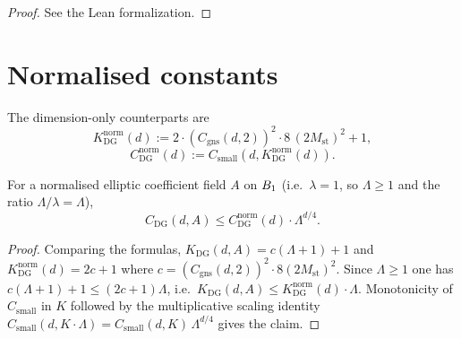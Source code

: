 \begin{proof}
\leanok
{}
See the Lean formalization.
\end{proof}

\section{Normalised constants}

\begin{definition}
\label{def:K_DeGiorgi_subsolution_normalized}
\leanok
{}
The dimension-only counterparts are
\begin{equation*}
  K^{\mathrm{norm}}_{\mathrm{DG}}(d) :=
    2 \cdot (C_{\mathrm{gns}}(d,2))^2 \cdot 8\, (2 M_{\mathrm{st}})^2 + 1,
\end{equation*}
\begin{equation*}
  C^{\mathrm{norm}}_{\mathrm{DG}}(d) :=
    C_{\mathrm{small}}(d, K^{\mathrm{norm}}_{\mathrm{DG}}(d)).
\end{equation*}
\end{definition}

\begin{lemma}
\label{lem:C_DeGiorgi_subsolution_le_normalized}
\leanok
{}
For a normalised elliptic coefficient field $A$ on $B_{1}$ (i.e.\
$\lambda = 1$, so $\Lambda \ge 1$ and the ratio
$\Lambda/\lambda = \Lambda$),
\begin{equation*}
  C_{\mathrm{DG}}(d, A) \le
    C^{\mathrm{norm}}_{\mathrm{DG}}(d) \cdot \Lambda^{d/4}.
\end{equation*}
\end{lemma}

\begin{proof}
\leanok
{}

Comparing the formulas, $K_{\mathrm{DG}}(d,A) = c (\Lambda+1) + 1$ and
$K^{\mathrm{norm}}_{\mathrm{DG}}(d) = 2c + 1$ where $c =
(C_{\mathrm{gns}}(d,2))^2 \cdot 8 (2 M_{\mathrm{st}})^2$. Since
$\Lambda \ge 1$ one has $c(\Lambda + 1) + 1 \le (2c+1)\Lambda$,
i.e.\ $K_{\mathrm{DG}}(d,A) \le K^{\mathrm{norm}}_{\mathrm{DG}}(d) \cdot
\Lambda$. Monotonicity of $C_{\mathrm{small}}$ in $K$ followed by the
multiplicative scaling identity
$C_{\mathrm{small}}(d, K \cdot \Lambda) = C_{\mathrm{small}}(d, K)\,
\Lambda^{d/4}$ gives the claim.
\end{proof}

